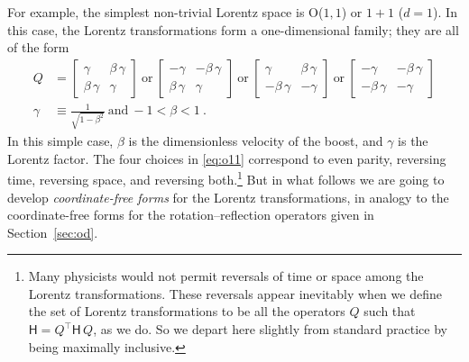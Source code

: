 \documentclass{article}
\newcommand{\metric}{\mathsf{H}}
\newcommand{\plus}{\!+\!} %
\newcommand{\secref}[1]{Section~\ref{#1}}
\begin{document}
For example, the simplest non-trivial Lorentz space is O($1,1$) or $1\plus1$ ($d=1$).
In this case, the Lorentz transformations form a one-dimensional family; they are all of the form
\begin{align}
    Q &= \begin{bmatrix}\gamma & \beta\,\gamma \\ \beta\,\gamma & \gamma\end{bmatrix} ~\mbox{or}~
    \begin{bmatrix}-\gamma & -\beta\,\gamma \\ \beta\,\gamma & \gamma\end{bmatrix} ~\mbox{or}~
    \begin{bmatrix}\gamma & \beta\,\gamma \\ -\beta\,\gamma & -\gamma\end{bmatrix}  ~\mbox{or}~
    \begin{bmatrix}-\gamma & -\beta\,\gamma \\ -\beta\,\gamma & -\gamma\end{bmatrix} \label{eq:o11}
    \\
    \gamma &\equiv \frac{1}{\sqrt{1 - \beta^2}} ~ \mbox{and} ~ -1 < \beta < 1 ~.\nonumber
\end{align}
In this simple case, $\beta$ is the dimensionless velocity of the boost, and $\gamma$ is the Lorentz factor.
The four choices in \eqref{eq:o11} correspond to even parity, reversing time, reversing space, and reversing both.\footnote{%
Many physicists would not permit reversals of time or space among the Lorentz transformations.
These reversals appear inevitably when we define the set of Lorentz transformations to be all the operators $Q$ such that $\metric=Q^\top\metric\,Q$, as we do.
So we depart here slightly from standard practice by being maximally inclusive.}
But in what follows we are going to develop \emph{coordinate-free forms} for the Lorentz transformations, in analogy to the coordinate-free forms for the rotation--reflection operators given in \secref{sec:od}.
\end{document}
